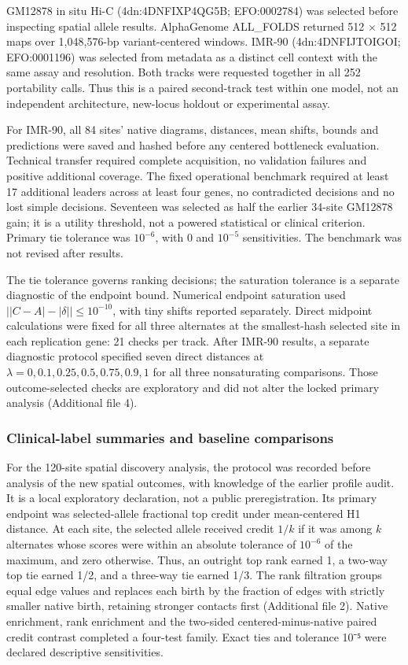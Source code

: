 \documentclass[
  11pt,
]{article}
\begin{document}
GM12878 in situ Hi-C (4dn:4DNFIXP4QG5B; EFO:0002784) was selected before
inspecting spatial allele results. AlphaGenome ALL\_FOLDS returned 512 ×
512 maps over 1,048,576-bp variant-centered windows. IMR-90
(4dn:4DNFIJTOIGOI; EFO:0001196) was selected from metadata as a distinct
cell context with the same assay and resolution. Both tracks were
requested together in all 252 portability calls. Thus this is a paired
second-track test within one model, not an independent architecture,
new-locus holdout or experimental assay.

For IMR-90, all 84 sites' native diagrams, distances, mean shifts,
bounds and predictions were saved and hashed before any centered
bottleneck evaluation. Technical transfer required complete acquisition,
no validation failures and positive additional coverage. The fixed
operational benchmark required at least 17 additional leaders across at
least four genes, no contradicted decisions and no lost simple
decisions. Seventeen was selected as half the earlier 34-site GM12878
gain; it is a utility threshold, not a powered statistical or clinical
criterion. Primary tie tolerance was \(10^{-6}\), with 0 and \(10^{-5}\)
sensitivities. The benchmark was not revised after results.

The tie tolerance governs ranking decisions; the saturation tolerance is
a separate diagnostic of the endpoint bound. Numerical endpoint
saturation used \(\bigl||C-A|-|\delta|\bigr|\leq10^{-10}\), with tiny
shifts reported separately. Direct midpoint calculations were fixed for
all three alternates at the smallest-hash selected site in each
replication gene: 21 checks per track. After IMR-90 results, a separate
diagnostic protocol specified seven direct distances at
\(\lambda=0,0.1,0.25,0.5,0.75,0.9,1\) for all three nonsaturating
comparisons. Those outcome-selected checks are exploratory and did not
alter the locked primary analysis (Additional file 4).

\subsubsection{Clinical-label summaries and baseline
comparisons}\label{clinical-label-summaries-and-baseline-comparisons}

For the 120-site spatial discovery analysis, the protocol was recorded
before analysis of the new spatial outcomes, with knowledge of the
earlier profile audit. It is a local exploratory declaration, not a
public preregistration. Its primary endpoint was selected-allele
fractional top credit under mean-centered H1 distance. At each site, the
selected allele received credit \(1/k\) if it was among \(k\) alternates
whose scores were within an absolute tolerance of \(10^{-6}\) of the
maximum, and zero otherwise. Thus, an outright top rank earned 1, a
two-way top tie earned 1/2, and a three-way tie earned 1/3. The rank
filtration groups equal edge values and replaces each birth by the
fraction of edges with strictly smaller native birth, retaining stronger
contacts first (Additional file 2). Native enrichment, rank enrichment
and the two-sided centered-minus-native paired credit contrast completed
a four-test family. Exact ties and tolerance 10⁻⁵ were declared
descriptive sensitivities.
\end{document}
